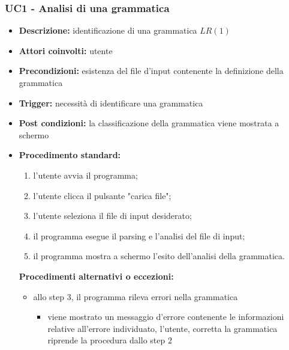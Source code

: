 \documentclass[12pt]{article}
\begin{document}
\subsubsection{UC1 - Analisi di una grammatica}
\begin{itemize}[label=]
\item \textbf{Descrizione:} identificazione di una grammatica $LR\left( 1 \right)$
\item \textbf{Attori coinvolti:} utente
\item \textbf{Precondizioni:} esistenza del file d'input contenente la definizione della grammatica
\item \textbf{Trigger:} necessità di identificare una grammatica
\item \textbf{Post condizioni:} la classificazione della grammatica viene mostrata a schermo
\item \textbf{Procedimento standard:}
\begin{enumerate}[label=\arabic*.]
\item l'utente avvia il programma;
\item l'utente clicca il pulsante "carica file";
\item l'utente seleziona il file di input desiderato;
\item il programma esegue il parsing e l'analisi del file di input;
\item il programma mostra a schermo l'esito dell'analisi della grammatica.
\end{enumerate}
\pagebreak
\textbf{Procedimenti alternativi o eccezioni:}
\begin{itemize}
\item allo step $3$, il programma rileva errori nella grammatica
\begin{itemize}[label=]
\item viene mostrato un messaggio d'errore contenente le informazioni relative all'errore individuato, l'utente, corretta la grammatica riprende la procedura dallo step $2$
\end{itemize}
\end{itemize}
\end{itemize}
\end{document}
